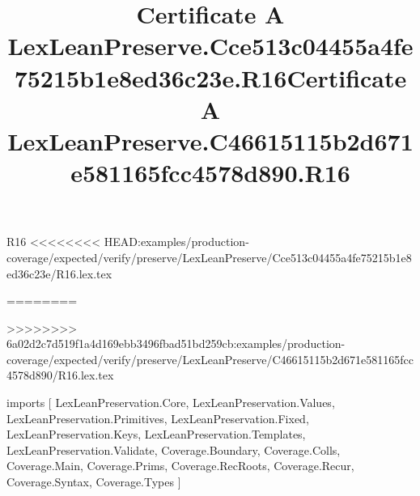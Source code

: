 \begin{lexlean}{R16}
<<<<<<<< HEAD:examples/production-coverage/expected/verify/preserve/LexLeanPreserve/Cce513c04455a4fe75215b1e8ed36c23e/R16.lex.tex
\title{Certificate A LexLeanPreserve.Cce513c04455a4fe75215b1e8ed36c23e.R16}
========
\title{Certificate A LexLeanPreserve.C46615115b2d671e581165fcc4578d890.R16}
>>>>>>>> 6a02d2c7d519f1a4d169ebb3496fbad51bd259cb:examples/production-coverage/expected/verify/preserve/LexLeanPreserve/C46615115b2d671e581165fcc4578d890/R16.lex.tex
\begin{coremodule}
imports [
  LexLeanPreservation.Core,
  LexLeanPreservation.Values,
  LexLeanPreservation.Primitives,
  LexLeanPreservation.Fixed,
  LexLeanPreservation.Keys,
  LexLeanPreservation.Templates,
  LexLeanPreservation.Validate,
  Coverage.Boundary,
  Coverage.Colls,
  Coverage.Main,
  Coverage.Prims,
  Coverage.RecRoots,
  Coverage.Recur,
  Coverage.Syntax,
  Coverage.Types
]


\end{coremodule}
\end{lexlean}
